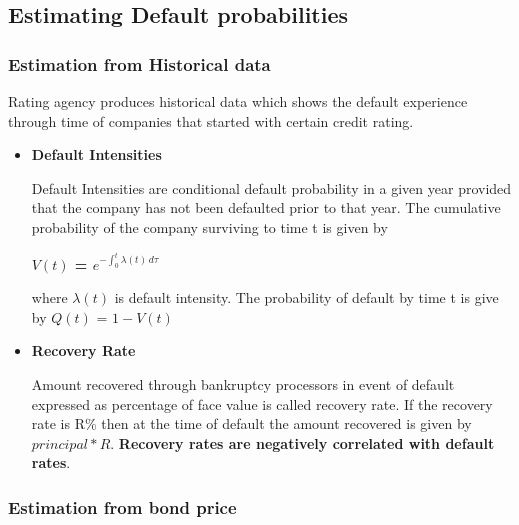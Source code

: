 \documentclass[11pt]{article}
\numberwithin{equation}{section}
\begin{document}
\subsection{Estimating Default probabilities}
\medskip

\subsubsection{Estimation from Historical data}
\medskip

Rating agency produces historical data which shows
the default experience through time of companies that started with certain credit rating. 
\begin{itemize}
\item\textbf{Default Intensities}
\medskip

Default Intensities are conditional default probability in a given year provided that the company has not been defaulted prior to that year. The cumulative probability of the company surviving to time t is given by 
\begin{center}
	\textbf{$ V(t) $ = $ e ^{-\int_0^{t} \lambda (t)\,d \tau }$}
\end{center}
where $\lambda (t)$ is default intensity. The probability of default by time t is give by $Q(t)$ = $1-V(t)$

\item\textbf{Recovery Rate}
\medskip

Amount recovered through bankruptcy processors in event of default expressed as percentage of face value is called recovery rate. If the recovery rate is R\% then at the time of default the amount recovered is given by $ principal*R $. \textbf{Recovery rates are negatively correlated with default rates}.

\end{itemize}

\subsubsection{Estimation from bond price}
\medskip
\end{document}
